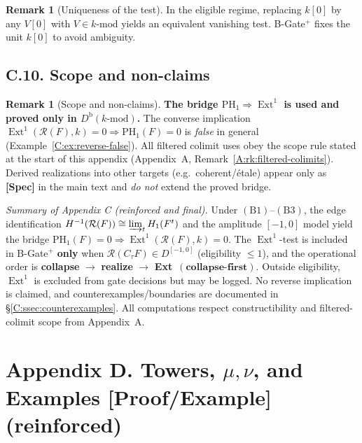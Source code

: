 \documentclass[11pt]{article}
\numberwithin{equation}{section}
\theoremstyle{plain}
\theoremstyle{definition}
\theoremstyle{remark}
\DeclareMathOperator{\Ext}{Ext}
\theoremstyle{plain}
\theoremstyle{definition}
\numberwithin{equation}{section}
\theoremstyle{definition}
\newtheorem{remark}[theorem]{Remark}
\numberwithin{equation}{section}
\theoremstyle{plain}
\theoremstyle{definition}
\theoremstyle{remark}
\begin{document}
\begin{remark}[Uniqueness of the test]
In the eligible regime, replacing \(k[0]\) by any \(V[0]\) with \(V\in k\text{-mod}\) yields an equivalent vanishing test.
B-Gate\(^{+}\) fixes the unit \(k[0]\) to avoid ambiguity.
\end{remark}

\subsection*{C.10. Scope and non-claims}

\begin{remark}[Scope and non-claims]\label{C:rk:scope}
\textbf{The bridge \(\mathrm{PH}_1\Rightarrow \Ext^1\) is used and proved only in \(D^{\mathrm{b}}(k\text{-mod})\).}
The converse implication \(\Ext^1(\mathcal{R}(F),k)=0 \Rightarrow \mathrm{PH}_1(F)=0\) is \emph{false} in general (Example~\ref{C:ex:reverse-false}).
All filtered colimit uses obey the scope rule stated at the start of this appendix (Appendix~A, Remark~\ref{A:rk:filtered-colimits}).
Derived realizations into other targets (e.g.\ coherent/étale) appear only as \textbf{[Spec]} in the main text and \emph{do not} extend the proved bridge.
\end{remark}

\medskip
\noindent\emph{Summary of Appendix C (reinforced and final).}
Under \((\mathrm{B}1)\)–\((\mathrm{B}3)\), the edge identification \(H^{-1}(\mathcal{R}(F))\cong \varinjlim_t H_1(F^t)\) and the amplitude \([-1,0]\) model yield the bridge \(\mathrm{PH}_1(F)=0\Rightarrow \Ext^1(\mathcal{R}(F),k)=0\).
The \(\Ext^1\)-test is included in B-Gate\(^{+}\) \textbf{only} when \(\mathcal{R}(C_\tau F)\in D^{[-1,0]}\) (eligibility \(\le 1\)), and the operational order is \textbf{collapse} \(\to\) \textbf{realize} \(\to\) \textbf{Ext} \(\,(\textbf{collapse-first})\).
Outside eligibility, \(\Ext^1\) is excluded from gate decisions but may be logged.
No reverse implication is claimed, and counterexamples/boundaries are documented in \S\ref{C:ssec:counterexamples}.
All computations respect constructibility and filtered-colimit scope from Appendix~A.



\section*{Appendix D. Towers, \texorpdfstring{$\mu,\nu$}{mu,nu}, and Examples [Proof/Example] (reinforced)}
\end{document}
